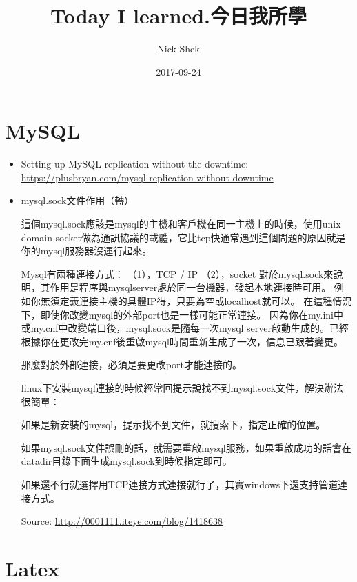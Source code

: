 \documentclass{article}
\title{Today I learned.今日我所學}
\author{Nick Shek}
\date{2017-09-24}
\begin{document}
\maketitle

\clearpage

\tableofcontents

\clearpage

\section{MySQL}

\begin{itemize}
\item Setting up MySQL replication without the downtime: \href{https://plusbryan.com/mysql-replication-without-downtime}{https://plusbryan.com/mysql-replication-without-downtime}
\item mysql.sock文件作用（轉）

這個mysql.sock應該是mysql的主機和客戶機在同一主機上的時候，使用unix domain socket做為通訊協議的載體，它比tcp快通常遇到這個問題的原因就是你的mysql服務器沒運行起來。


Mysql有兩種連接方式：
（1），TCP / IP
（2），socket
對於mysql.sock來說明，其作用是程序與mysqlserver處於同一台機器，發起本地連接時可用。
例如你無須定義連接主機的具體IP得，只要為空或localhost就可以。
在這種情況下，即使你改變mysql的外部port也是一樣可能正常連接。
因為你在my.ini中或my.cnf中改變端口後，mysql.sock是隨每一次mysql server啟動生成的。已經根據你在更改完my.cnf後重啟mysql時間重新生成了一次，信息已跟著變更。

那麼對於外部連接，必須是要更改port才能連接的。

linux下安裝mysql連接的時候經常回提示說找不到mysql.sock文件，解決辦法很簡單：

如果是新安裝的mysql，提示找不到文件，就搜索下，指定正確的位置。

如果mysql.sock文件誤刪的話，就需要重啟mysql服務，如果重啟成功的話會在datadir目錄下面生成mysql.sock到時候指定即可。

如果還不行就選擇用TCP連接方式連接就行了，其實windows下還支持管道連接方式。

Source: \href{http://0001111.iteye.com/blog/1418638}{http://0001111.iteye.com/blog/1418638}
\end{itemize}

\section{Latex}
\end{document}

